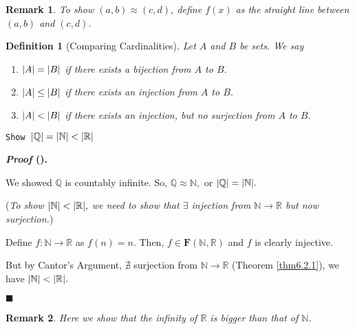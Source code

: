 \documentclass[12pt,a4paper]{article}
\newtheorem{df}{Definition}[subsection]
\newcounter{nprf}[subsection]
\newtheorem*{rmk}{\indent Remark}
\newenvironment*{prf}{\par\indent\textbf{\textit{Proof} (\stepcounter{nprf}\thenprf). }\par }{\par\hfill $\blacksquare$\par}
\def\R{{\mathbb{R}}}
\def\Q{{\mathbb{Q}}}
\def\N{{\mathbb{N}}}
\def\F{\mathbf{F}}
\begin{document}
\begin{rmk}
	To show $(a,b)\approx(c,d)$, define $f(x)$ as the straight line between $(a,b)$ and $(c,d).$	
\end{rmk}
\begin{df}[Comparing Cardinalities]
	Let $A$ and $B$ be sets. We say 
	\begin{enumerate}
		\item $\qty|A|=\qty|B|$ if there exists a bijection from $A$ to $B$.
		\item $\qty|A|\leq\qty|B|$ if there exists an injection from $A$ to $B$.
		\item $\qty|A|<\qty|B|$ if there exists an injection, but no surjection from $A$ to $B$. 
	\end{enumerate}
\end{df}
\begin{framed}
\noindent\texttt{Show $\qty|\Q|=\qty|\N|<\qty|\R|$}
\begin{prf}
	We showed $\Q$ is countably infinite. So, $\Q\approx\N,$ or $\qty|\Q|=\qty|\N|.$\par (\textit{To show $\qty|\N|<\qty|\R|,$ we need to show that $\exists$ injection from $\N\to\R$ but now surjection.})\par Define $f:\N\to\R$ as $f(n)=n.$ Then, $f\in\F(\N,\R)$ and $f$ is clearly injective.\par But by Cantor's Argument, $\nexists$ surjection from $\N\to\R$ (Theorem \ref{thm6.2.1}), we have $\qty|\N|<\qty|\R|.$
\end{prf}
\begin{rmk}
	Here we show that the infinity of $\R$ is bigger than that of $\N$.
\end{rmk}	
\end{framed}
\end{document}
